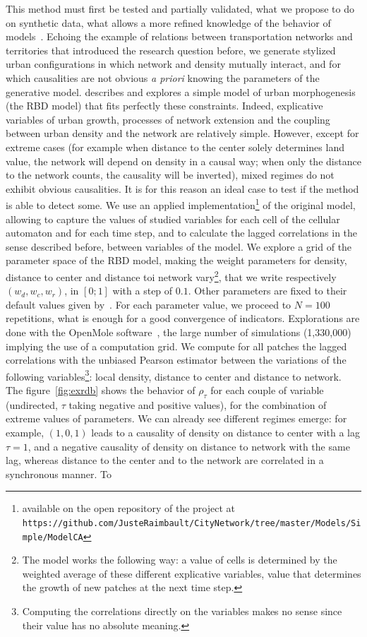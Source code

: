 \documentclass[english]{./sageo}
\begin{document}
This method must first be tested and partially validated, what we propose to do on synthetic data, what allows a more refined knowledge of the behavior of models~\cite{raimbaulthalshs01514415}. Echoing the example of relations between transportation networks and territories that introduced the research question before, we generate stylized urban configurations in which network and density mutually interact, and for which causalities are not obvious \emph{a priori} knowing the parameters of the generative model. \cite{raimbault2014hybrid} describes and explores a simple model of urban morphogenesis (the RBD model) that fits perfectly these constraints. Indeed, explicative variables of urban growth, processes of network extension and the coupling between urban density and the network are relatively simple. However, except for extreme cases (for example when distance to the center solely determines land value, the network will depend on density in a causal way; when only the distance to the network counts, the causality will be inverted), mixed regimes do not exhibit obvious causalities. It is for this reason an ideal case to test if the method is able to detect some. We use an applied implementation\footnote{available on the open repository of the project at \\\texttt{https://github.com/JusteRaimbault/CityNetwork/tree/master/Models/Simple/ModelCA}} of the original model, allowing to capture the values of studied variables for each cell of the cellular automaton and for each time step, and to calculate the lagged correlations in the sense described before, between variables of the model. We explore a grid of the parameter space of the RBD model, making the weight parameters for density, distance to center and distance toi network vary\footnote{The model works the following way: a value of cells is determined by the weighted average of these different explicative variables, value that determines the growth of new patches at the next time step.}, that we write respectively $(w_{d},w_{c},w_{r})$, in $\left[0;1\right]$ with a step of $0.1$. Other parameters are fixed to their default values given by~\cite{raimbault2014hybrid}. For each parameter value, we proceed to $N=100$ repetitions, what is enough for a good convergence of indicators. Explorations are done with the OpenMole software~\cite{reuillon2013openmole}, the large number of simulations (1,330,000) implying the use of a computation grid. We compute for all patches the lagged correlations with the unbiased Pearson estimator between the variations of the following variables\footnote{Computing the correlations directly on the variables makes no sense since their value has no absolute meaning.}: local density, distance to center and distance to network. The figure~\ref{fig:exrdb}  shows the behavior of $\rho_{\tau}$ for each couple of variable (undirected, $\tau$ taking negative and positive values), for the combination of extreme values of parameters. We can already see different regimes emerge: for example, $(1,0,1)$ leads to a causality of density on distance to center with a lag $\tau=1$, and a negative causality of density on distance to network with the same lag, whereas distance to the center and to the network are correlated in a synchronous manner. To 
\end{document}
